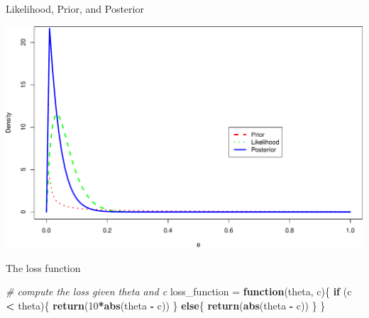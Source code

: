 \documentclass[
  ignorenonframetext,
]{beamer}
\newenvironment{Shaded}{\begin{snugshade}}{\end{snugshade}}
\newcommand{\CommentTok}[1]{\textcolor[rgb]{0.56,0.35,0.01}{\textit{#1}}}
\newcommand{\ControlFlowTok}[1]{\textcolor[rgb]{0.13,0.29,0.53}{\textbf{#1}}}
\newcommand{\DecValTok}[1]{\textcolor[rgb]{0.00,0.00,0.81}{#1}}
\newcommand{\KeywordTok}[1]{\textcolor[rgb]{0.13,0.29,0.53}{\textbf{#1}}}
\newcommand{\NormalTok}[1]{#1}
\newcommand{\OperatorTok}[1]{\textcolor[rgb]{0.81,0.36,0.00}{\textbf{#1}}}
\newcommand{\StringTok}[1]{\textcolor[rgb]{0.31,0.60,0.02}{#1}}
\begin{document}
\begin{frame}{Likelihood, Prior, and Posterior}
\protect\hypertarget{likelihood-prior-and-posterior}{}

\includegraphics{02-intro-to-Bayes_files/figure-beamer/unnamed-chunk-2-1.pdf}

\end{frame}

\begin{frame}[fragile]{The loss function}
\protect\hypertarget{the-loss-function}{}

\begin{Shaded}
\begin{Highlighting}[]
\CommentTok{# compute the loss given theta and c }
\NormalTok{loss_function =}\StringTok{ }\ControlFlowTok{function}\NormalTok{(theta, c)\{}
  \ControlFlowTok{if}\NormalTok{ (c }\OperatorTok{<}\StringTok{ }\NormalTok{theta)\{}
    \KeywordTok{return}\NormalTok{(}\DecValTok{10}\OperatorTok{*}\KeywordTok{abs}\NormalTok{(theta }\OperatorTok{-}\StringTok{ }\NormalTok{c))}
\NormalTok{  \} }\ControlFlowTok{else}\NormalTok{\{}
    \KeywordTok{return}\NormalTok{(}\KeywordTok{abs}\NormalTok{(theta }\OperatorTok{-}\StringTok{ }\NormalTok{c))}
\NormalTok{  \}}
\NormalTok{\}}
\end{Highlighting}
\end{Shaded}

\end{frame}
\end{document}
